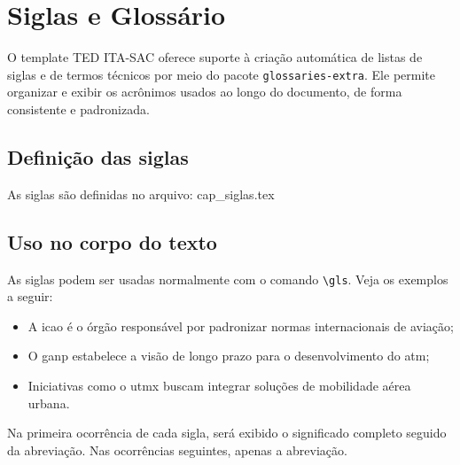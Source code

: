 \chapter{Siglas e Glossário}

O template TED ITA-SAC oferece suporte à criação automática de listas de siglas e de termos técnicos por meio do pacote \texttt{glossaries-extra}. Ele permite organizar e exibir os acrônimos usados ao longo do documento, de forma consistente e padronizada.

\section{Definição das siglas}

As siglas são definidas no arquivo: cap\_siglas.tex


\section{Uso no corpo do texto}

As siglas podem ser usadas normalmente com o comando \verb|\gls|. Veja os exemplos a seguir:

\begin{itemize}
	\item A \gls{icao} é o órgão responsável por padronizar normas internacionais de aviação;
	\item O \gls{ganp} estabelece a visão de longo prazo para o desenvolvimento do \gls{atm};
	\item Iniciativas como o \gls{utmx} buscam integrar soluções de mobilidade aérea urbana.
\end{itemize}

Na primeira ocorrência de cada sigla, será exibido o significado completo seguido da abreviação. Nas ocorrências seguintes, apenas a abreviação.

